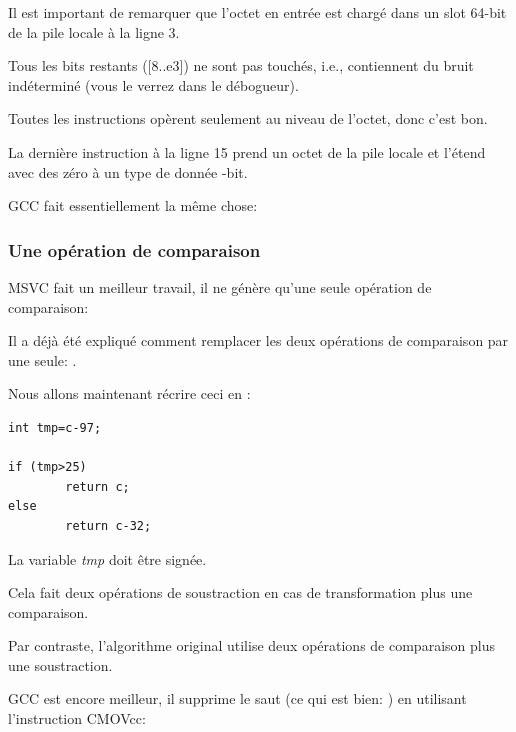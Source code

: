 Il est important de remarquer que l'octet en entrée est chargé dans un slot 64-bit
de la pile locale à la ligne 3.

Tous les bits restants ([8..e3]) ne sont pas touchés, i.e., contiennent du bruit indéterminé
(vous le verrez dans le débogueur).

Toutes les instructions opèrent seulement au niveau de l'octet, donc c'est bon.

La dernière instruction  à la ligne 15 prend un octet de la pile locale
et l'étend avec des zéro à un type de donnée -bit.

GCC \NonOptimizing fait essentiellement la même chose:



\subsubsection{Une opération de comparaison}
\label{toupper_one_comparison}

MSVC \Optimizing fait un meilleur travail, il ne génère qu'une seule opération de
comparaison:



Il a déjà été expliqué comment remplacer les deux opérations de comparaison par une
seule: .

Nous allons maintenant récrire ceci en \CCpp:

\begin{lstlisting}[style=customc]
int tmp=c-97;

if (tmp>25)
        return c;
else
        return c-32;
\end{lstlisting}

La variable \emph{tmp} doit être signée.

Cela fait deux opérations de soustraction en cas de transformation plus une comparaison.

Par contraste, l'algorithme original utilise deux opérations de comparaison plus
une soustraction.

GCC \Optimizing est encore meilleur, il supprime le saut (ce qui est bien: )
en utilisant l'instruction CMOVcc:



